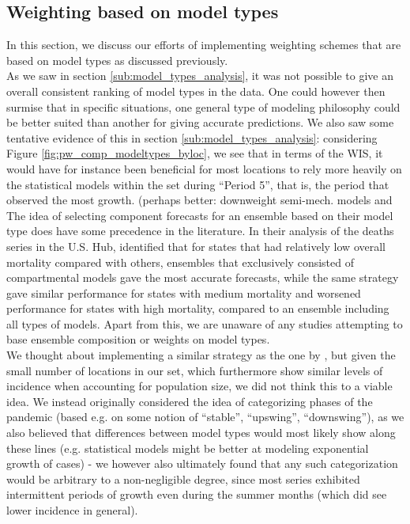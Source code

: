 \subsection{Weighting based on model types} \label{sub:weighting_based_on_model_types}
In this section, we discuss our efforts of implementing weighting schemes that are based on model types as discussed previously.\\
As we saw in section \ref{sub:model_types_analysis}, it was not possible to give an overall consistent ranking of model types in the data. One could however then surmise that in specific situations, one general type of modeling philosophy could be better suited than another for giving accurate predictions. We also saw some tentative evidence of this in section \ref{sub:model_types_analysis}: considering Figure \ref{fig:pw_comp_modeltypes_byloc}, we see that in terms of the WIS, it would have for instance been beneficial for most locations to rely more heavily on the statistical models within the set during ``Period 5'', that is, the period that observed the most growth. (perhaps better: downweight semi-mech. models and \\
The idea of selecting component forecasts for an ensemble based on their model type does have some precedence in the literature. In their analysis of the deaths series in the U.S. Hub, \cite{taylor_combining_2021} identified that for states that had relatively low overall mortality compared with others, ensembles that exclusively consisted of compartmental models gave the most accurate forecasts, while the same strategy gave similar performance for states with medium mortality and worsened performance for states with high mortality, compared to an ensemble including all types of models. Apart from this, we are unaware of any studies attempting to base ensemble composition or weights on model types.\\
We thought about implementing a similar strategy as the one by \cite{taylor_combining_2021}, but given the small number of locations in our set, which furthermore show similar levels of incidence when accounting for population size, we did not think this to a viable idea. We instead originally considered the idea of categorizing phases of the pandemic (based e.g. on some notion of ``stable'', ``upswing'', ``downswing''), as we also believed that differences between model types would most likely show along these lines (e.g. statistical models might be better at modeling exponential growth of cases) - we however also ultimately found that any such categorization would be arbitrary to a non-negligible degree, since most series exhibited intermittent periods of growth even during the summer months (which did see lower incidence in general).\\
